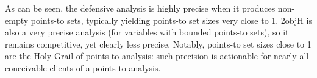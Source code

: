 As can be seen, the defensive analysis is highly precise when it produces non-empty
points-to sets, typically yielding points-to set sizes very close to
1. 2objH is also a very precise analysis (for variables with bounded
points-to sets), so it remains competitive, yet clearly less precise.
Notably, points-to set sizes close to 1 are the Holy Grail of points-to
analysis: such precision is actionable for nearly all conceivable clients
of a points-to analysis.


